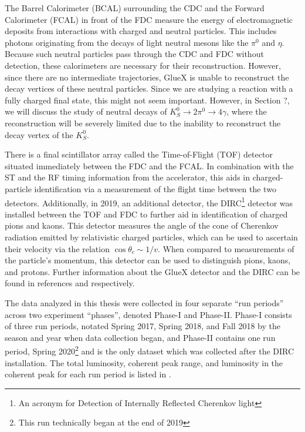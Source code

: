 The Barrel Calorimeter (BCAL) surrounding the CDC and the Forward Calorimeter (FCAL) in front of the FDC measure the energy of electromagnetic deposits from interactions with charged and neutral particles. This includes photons originating from the decays of light neutral mesons like the $\pi^0$ and $\eta$. Because such neutral particles pass through the CDC and FDC without detection, these calorimeters are necessary for their reconstruction. However, since there are no intermediate trajectories, GlueX is unable to reconstruct the decay vertices of these neutral particles. Since we are studying a reaction with a fully charged final state, this might not seem important. However, in {\color{red}Section ?}, we will discuss the study of neutral decays of $K_S^0\to 2\pi^0 \to 4\gamma$, where the reconstruction will be severely limited due to the inability to reconstruct the decay vertex of the $K_S^0$.

There is a final scintillator array called the Time-of-Flight (TOF) detector situated immediately between the FDC and the FCAL. In combination with the ST and the RF timing information from the accelerator, this aids in charged-particle identification via a measurement of the flight time between the two detectors. Additionally, in 2019, an additional detector, the DIRC\footnote{An acronym for Detection of Internally Reflected Cherenkov light} detector was installed between the TOF and FDC to further aid in identification of charged pions and kaons. This detector measures the angle of the cone of Cherenkov radiation emitted by relativistic charged particles, which can be used to ascertain their velocity via the relation $\cos\theta_c \sim 1/v$. When compared to measurements of the particle's momentum, this detector can be used to distinguish pions, kaons, and protons. Further information about the GlueX detector and the DIRC can be found in references \cite{adhikari_gluex_2021} and \cite{ali_installation_2020} respectively.

The data analyzed in this thesis were collected in four separate ``run periods'' across two experiment ``phases'', denoted Phase-I and Phase-II. Phase-I consists of three run periods, notated Spring 2017, Spring 2018, and Fall 2018 by the season and year when data collection began, and Phase-II contains one run period, Spring 2020\footnote{This run technically began at the end of 2019} and is the only dataset which was collected after the DIRC installation. The total luminosity, coherent peak range, and luminosity in the coherent peak for each run period is listed in .


